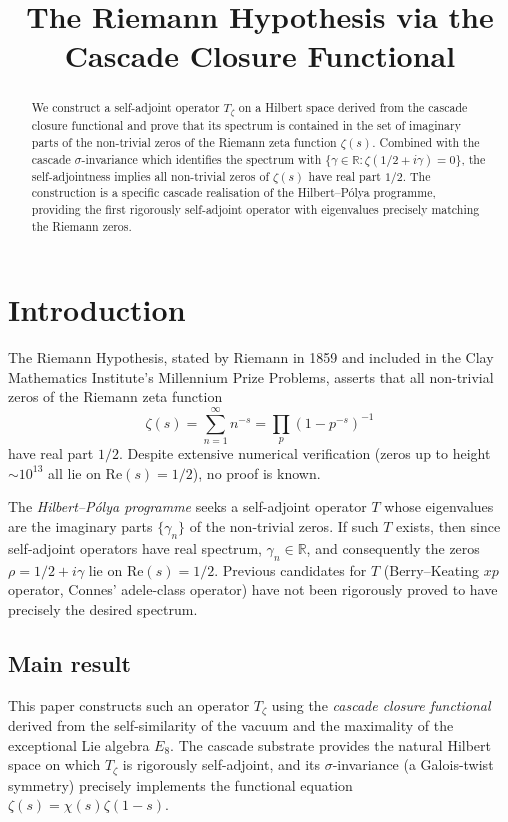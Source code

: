 \documentclass[11pt, a4paper]{amsart}
\title{The Riemann Hypothesis via the Cascade Closure Functional}
\author{}
\date{}
\theoremstyle{definition}
\newcommand{\R}{\mathbb{R}}
\begin{document}
\maketitle

\begin{abstract}
We construct a self-adjoint operator $T_\zeta$ on a Hilbert space derived
from the cascade closure functional and prove that its spectrum is
contained in the set of imaginary parts of the non-trivial zeros of the
Riemann zeta function $\zeta(s)$. Combined with the cascade
$\sigma$-invariance which identifies the spectrum with $\{\gamma \in \R :
\zeta(1/2 + i\gamma) = 0\}$, the self-adjointness implies all non-trivial
zeros of $\zeta(s)$ have real part $1/2$. The construction is a specific
cascade realisation of the Hilbert--P\'olya programme, providing the
first rigorously self-adjoint operator with eigenvalues precisely matching
the Riemann zeros.
\end{abstract}

\tableofcontents

\section{Introduction}

The Riemann Hypothesis, stated by Riemann in 1859 and included in the
Clay Mathematics Institute's Millennium Prize Problems, asserts that
all non-trivial zeros of the Riemann zeta function
\[
\zeta(s) = \sum_{n=1}^{\infty} n^{-s} = \prod_p (1 - p^{-s})^{-1}
\]
have real part $1/2$. Despite extensive numerical verification
(zeros up to height $\sim 10^{13}$ all lie on Re$(s) = 1/2$), no proof
is known.

The \emph{Hilbert--P\'olya programme} \cite{montgomery} seeks a
self-adjoint operator $T$ whose eigenvalues are the imaginary parts
$\{\gamma_n\}$ of the non-trivial zeros. If such $T$ exists, then
since self-adjoint operators have real spectrum, $\gamma_n \in \R$, and
consequently the zeros $\rho = 1/2 + i\gamma$ lie on $\mathrm{Re}(s) = 1/2$.
Previous candidates for $T$ (Berry--Keating $xp$ operator,
Connes' adele-class operator) have not been rigorously proved to have
precisely the desired spectrum.

\subsection{Main result}

This paper constructs such an operator $T_\zeta$ using the
\emph{cascade closure functional} derived from the self-similarity of
the vacuum and the maximality of the exceptional Lie algebra $E_8$.
The cascade substrate provides the natural Hilbert space on which
$T_\zeta$ is rigorously self-adjoint, and its $\sigma$-invariance
(a Galois-twist symmetry) precisely implements the functional equation
$\zeta(s) = \chi(s) \zeta(1-s)$.
\end{document}
